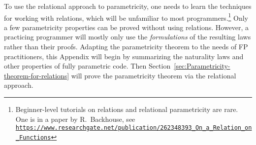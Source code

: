 To use the relational approach to parametricity, one needs to learn
the techniques for working with relations, which will be unfamiliar
to most programmers.\footnote{Beginner-level tutorials on relations and relational parametricity
are rare. One is in a paper by R.~Backhouse,
see \texttt{\href{https://www.researchgate.net/publication/262348393_On_a_Relation_on_Functions}{https://www.researchgate.net/publication/262348393\_On\_a\_Relation\_on\_Functions}}} Only a few parametricity properties can be proved without using relations.
However, a practicing programmer will mostly only use the \emph{formulations}
of the resulting laws rather than their proofs. Adapting the parametricity
theorem to the needs of FP practitioners, this Appendix will begin
by summarizing the naturality laws and other properties of fully parametric
code. Then Section~\ref{sec:Parametricity-theorem-for-relations}
will prove the parametricity theorem via the relational approach.%
\begin{comment}
Section~\ref{sec:Commutativity-laws-for-type-constructors} proves
that fully parametric type constructors obey commutativity laws. Section~\ref{sec:Naturality-laws-for-fully-parametric-functions}
shows, without using relations, that fully parametric functions satisfy
dinaturality laws (a generalization of naturality laws to arbitrary
type signatures). An important consequence, proved in Section~\ref{sec:Uniqueness-of-functor-and-contrafunctor},
is that the code implementing the functor and contrafunctor typeclasses
is unique. Finally, Section~\ref{sec:Parametricity-theorem-for-relations}
explains the relational approach to parametricity and proves the relational
parametricity theorem. 

Additional literature:

{[}1{]}: Girard, J.-Y.; Scedrov, A. \& Scott, P. J. Normal Forms and
Cut-Free Proofs as Natural Transformations. Logic From Computer Science,
Mathematical Science Research Institute Publications 21, Springer-Verlag,
1992, 217-241. http://citeseer.ist.psu.edu/viewdoc/summary?doi=10.1.1.41.811

{[}2{]}: Bainbridge, E. S.; Freyd, P. J.; Scedrov, A. \& Scott, P.
J. Functorial polymorphism. Theoretical computer science, Elsevier,
1990, 70, 35-64. https://core.ac.uk/display/82270459

{[}3{]}: De Lataillade, J. Dinatural Terms in System F. Logic in Computer
Science, 24th Annual IEEE Symposium, 267-276, 2009. https://www.irif.fr/\textasciitilde delatail/dinat.pdf

{[}4{]}: Pistone, P. On completeness and parametricity in the realizability
semantics of System F. https://arxiv.org/abs/1802.05143

{[}5{]}: https://libres.uncg.edu/ir/asu/f/Johann\_Patricia\_2014\_A\_Relationally\_Parametric\_Model\_Of\_Dependent\_Type\_Theory..pdf

See discussion here: https://cstheory.stackexchange.com/questions/42256/is-case-analysis-on-normal-forms-of-lambda-terms-sufficient-to-prove-parametrici
\end{comment}

